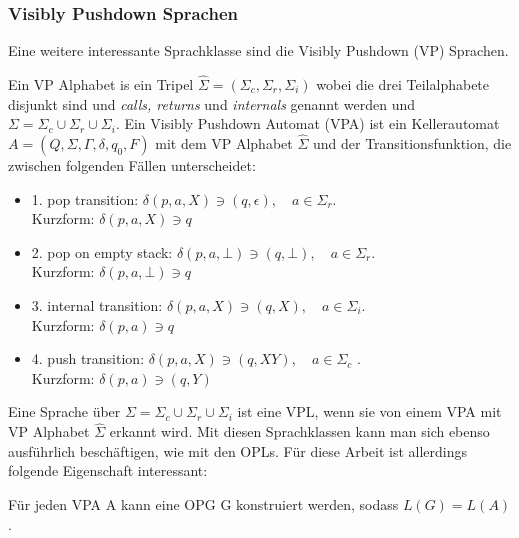 \subsubsection{Visibly Pushdown Sprachen}
Eine weitere interessante Sprachklasse sind die Visibly Pushdown (VP) Sprachen. \cite{vpl}
\begin{definition}
Ein VP Alphabet is ein Tripel $\hat{\Sigma}=(\Sigma_c, \Sigma_r, \Sigma_i)$ wobei die drei Teilalphabete disjunkt sind und \textit{calls, returns} und \textit{internals} genannt werden und $\Sigma=\Sigma_c \cup \Sigma_r \cup \Sigma_i$. Ein Visibly Pushdown Automat (VPA) ist ein Kellerautomat $A=(Q, \Sigma, \Gamma, \delta, q_0, F)$ mit dem VP Alphabet $\hat{\Sigma}$ und der Transitionsfunktion, die zwischen folgenden Fällen unterscheidet:
\begin{itemize}
\item
1. pop transition: $\delta(p,a,X) \ni (q, \epsilon), \quad a \in \Sigma_r$.\\
 Kurzform: $\delta(p, a, X) \ni q$
\item
2. pop on empty stack: $\delta(p, a, \bot) \ni (q, \bot), \quad a \in \Sigma_r$.\\
 Kurzform: $\delta(p, a, \bot) \ni q$
\item
3. internal transition: $\delta(p,a,X) \ni (q, X), \quad a \in \Sigma_i$. \\Kurzform:
 $\delta(p, a) \ni q$
\item
4. push transition: $\delta(p, a, X) \ni (q, XY), \quad a \in \Sigma_c$ .\\ Kurzform:
 $\delta(p, a) \ni (q, Y)$
\end{itemize}
\end{definition}
Eine Sprache über $\Sigma=\Sigma_c \cup \Sigma_r \cup \Sigma_i$ ist eine VPL, wenn sie von einem VPA mit VP Alphabet $\hat{\Sigma}$ erkannt wird.
Mit diesen Sprachklassen kann man sich ebenso ausführlich beschäftigen, wie mit den OPLs. Für diese Arbeit ist allerdings folgende Eigenschaft interessant\cite{op_vpl_property}:
\begin{lemma}
Für jeden VPA A kann eine OPG G konstruiert werden, sodass $L(G)=L(A)$.
\end{lemma}
